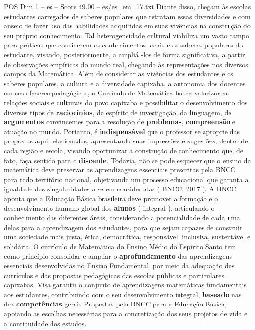 \begin{textsample}{POS Dim 1 – es – Score 49.00 – es/es\_em\_17.txt}
Diante disso, chegam às escolas estudantes carregados de saberes populares que retratam essas diversidades e com anseio de fazer uso das habilidades adquiridas em suas vivências na construção do seu próprio conhecimento.
Tal heterogeneidade cultural viabiliza um vasto campo para práticas que considerem os conhecimentos locais e os saberes populares do estudante, visando, posteriormente, a ampliá -los de forma significativa, a partir de observações empíricas do mundo real, chegando às representações nos diversos campos da Matemática.
Além de considerar as vivências dos estudantes e os saberes populares, a cultura e a diversidade capixaba, a autonomia dos docentes em seus fazeres pedagógicos, o Currículo de Matemática busca valorizar as relações sociais e culturais do povo capixaba e possibilitar o desenvolvimento dos diversos tipos de \textbf{raciocínios}, do espírito de investigação, da linguagem, de \textbf{argumentos} convincentes para a resolução de \textbf{problemas}, \textbf{compreensão} e atuação no mundo.
Portanto, é \textbf{indispensável} que o professor se aproprie das propostas aqui relacionadas, apresentando suas impressões e sugestões, dentro de cada região e escola, visando oportunizar a construção de conhecimento que, de fato, faça sentido para o \textbf{discente}.
Todavia, não se pode esquecer que o ensino da matemática deve preservar as aprendizagens essenciais prescritas pela BNCC para todo território nacional, objetivando um processo educacional que garanta a igualdade das singularidades a serem consideradas ( BNCC, 2017 ).
A BNCC aponta que a Educação Básica brasileira deve promover a formação e o desenvolvimento humano global dos \textbf{alunos} ( integral ), articulando o conhecimento das diferentes áreas, considerando a potencialidade de cada uma delas para a aprendizagem dos estudantes, para que sejam capazes de construir uma sociedade mais justa, ética, democrática, responsável, inclusiva, sustentável e solidária.
O currículo de Matemática do Ensino Médio do Espírito Santo tem como princípio consolidar e ampliar o \textbf{aprofundamento} das aprendizagens essenciais desenvolvidas no Ensino Fundamental, por meio da adequação dos currículos e das propostas pedagógicas das escolas públicas e particulares capixabas.
Visa garantir o conjunto de aprendizagens matemáticas fundamentais aos estudantes, contribuindo com o seu desenvolvimento integral, \textbf{baseado} nas dez \textbf{competências} gerais Propostas pela BNCC para a Educação Básica, apoiando as escolhas necessárias para a concretização dos seus projetos de vida e a continuidade dos estudos.

\end{textsample}
